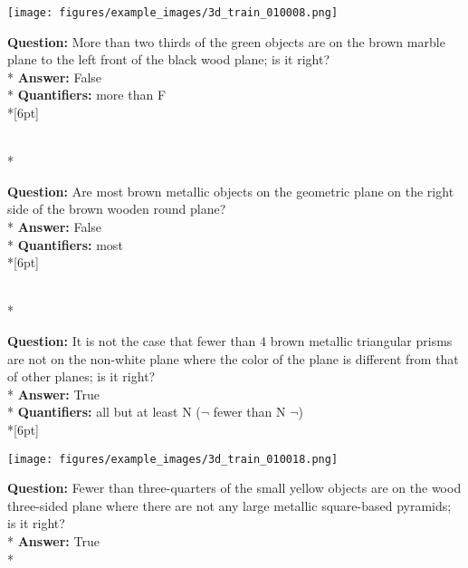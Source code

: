 \begin{figure*}  
\begin{minipage}{0.48\textwidth}
    \texttt{[image: figures/example\_images/3d\_train\_010008.png]}
    \begin{minipage}[t][2.2cm][t]{1\textwidth}
      \footnotesize
      \textbf{Question:} More than two thirds of the green objects are on the brown marble plane to the left front of the black wood plane; is it right? \\*
      \textbf{Answer:} False \\*
      \textbf{Quantifiers:} more than F \\*[6pt]
    \end{minipage}\\*
    \begin{minipage}[t][2.2cm][t]{1\textwidth}
      \footnotesize
      \textbf{Question:} Are most brown metallic objects on the geometric plane on the right side of the brown wooden round plane? \\*
      \textbf{Answer:} False \\*
      \textbf{Quantifiers:} most  \\*[6pt]
    \end{minipage}\\*
    \begin{minipage}[t][2.2cm][t]{1\textwidth}
      \footnotesize
      \textbf{Question:} It is not the case that fewer than 4 brown metallic triangular prisms are not on the non-white plane where the color of the plane is different from that of other planes; is it right? \\*
      \textbf{Answer:} True \\*
      \textbf{Quantifiers:} all but at least N ($\neg$ fewer than N $\neg$) \\*[6pt]
    \end{minipage}
  \end{minipage}
  \hspace{3.5mm}
  \begin{minipage}{0.48\textwidth}
    \texttt{[image: figures/example\_images/3d\_train\_010018.png]}
    \begin{minipage}[t][2.2cm][t]{1\textwidth}
      \footnotesize
      \textbf{Question:} Fewer than three-quarters of the small yellow objects are on the wood three-sided plane where there are not any large metallic square-based pyramids; is it right? \\*
      \textbf{Answer:} True \\*

\end{minipage}
\end{minipage}
\end{figure*}
